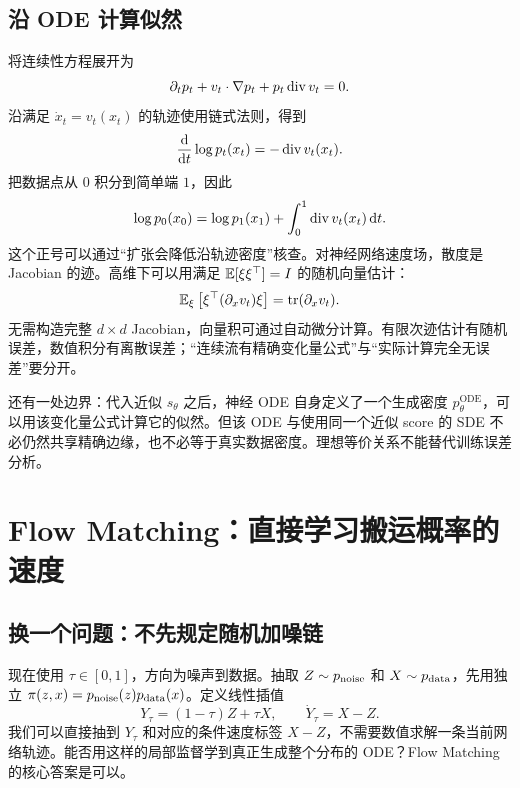 \subsection{沿 ODE 计算似然}
将连续性方程展开为
\begin{equation}
 \partial_t p_t+v_t\cdot\nabla p_t+p_t\operatorname{div} v_t=0.
\end{equation}
沿满足 $\dot x_t=v_t(x_t)$ 的轨迹使用链式法则，得到
\begin{equation}
 \frac{\mathop{}\!\mathrm{d}}{\mathop{}\!\mathrm{d} t}\log p_t(x_t)=-\operatorname{div} v_t(x_t).
\end{equation}
把数据点从 $0$ 积分到简单端 $1$，因此
\begin{equation}
 \log p_0(x_0)=\log p_1(x_1)+\int_0^1\operatorname{div} v_t(x_t)\mathop{}\!\mathrm{d} t.
 \label{eq:cnf-likelihood}
\end{equation}
这个正号可以通过“扩张会降低沿轨迹密度”核查。对神经网络速度场，散度是 Jacobian 的迹。高维下可以用满足 $\mathbb{E}[\xi\xi^\top]=I$ 的随机向量估计：
\begin{equation}
 \mathbb{E}_\xi\left[\xi^\top(\partial_xv_t)\xi\right]=\operatorname{tr}(\partial_xv_t).
\end{equation}
无需构造完整 $d\times d$ Jacobian，向量积可通过自动微分计算。有限次迹估计有随机误差，数值积分有离散误差；“连续流有精确变化量公式”与“实际计算完全无误差”要分开。

还有一处边界：代入近似 $s_\theta$ 之后，神经 ODE 自身定义了一个生成密度 $p_\theta^{\mathrm{ODE}}$，可以用该变化量公式计算它的似然。但该 ODE 与使用同一个近似 score 的 SDE 不必仍然共享精确边缘，也不必等于真实数据密度。理想等价关系不能替代训练误差分析。

\section{Flow Matching：直接学习搬运概率的速度}\label{sec:flowmatching}
\subsection{换一个问题：不先规定随机加噪链}
现在使用 $\tau\in[0,1]$，方向为噪声到数据。抽取 $Z\sim p_{\mathrm{noise}}$ 和 $X\sim p_{\mathrm{data}}$，先用独立 $\pi(z,x)=p_{\mathrm{noise}}(z)p_{\mathrm{data}}(x)$。定义线性插值
\begin{equation}
 Y_\tau=(1-\tau)Z+\tau X,\qquad \dot Y_\tau=X-Z.
 \label{eq:linear-interpolant}
\end{equation}
我们可以直接抽到 $Y_\tau$ 和对应的条件速度标签 $X-Z$，不需要数值求解一条当前网络轨迹。能否用这样的局部监督学到真正生成整个分布的 ODE？Flow Matching 的核心答案是可以\cite{r_fm}。

